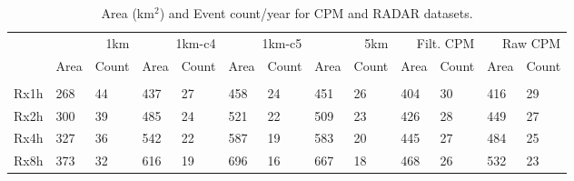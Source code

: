 \begin{table}[ht!]
\caption{Area (km$^2$) and Event count/year for  CPM  and  RADAR datasets.}
\label{tab:event_stats}
\begin{tabular}{l|ll|ll|ll|ll|ll|ll}
\toprule
 & \multicolumn{2}{r}{1km} & \multicolumn{2}{r}{1km-c4} & \multicolumn{2}{r}{1km-c5} & \multicolumn{2}{r}{5km} & \multicolumn{2}{r}{Filt. CPM} & \multicolumn{2}{r}{Raw CPM} \\
 & Area & Count & Area & Count & Area & Count & Area & Count & Area & Count & Area & Count \\
 &  &  &  &  &  &  &  &  &  &  &  &  \\
\midrule
Rx1h & 268 & 44 & 437 & 27 & 458 & 24 & 451 & 26 & 404 & 30 & 416 & 29 \\
Rx2h & 300 & 39 & 485 & 24 & 521 & 22 & 509 & 23 & 426 & 28 & 449 & 27 \\
Rx4h & 327 & 36 & 542 & 22 & 587 & 19 & 583 & 20 & 445 & 27 & 484 & 25 \\
Rx8h & 373 & 32 & 616 & 19 & 696 & 16 & 667 & 18 & 468 & 26 & 532 & 23 \\
\bottomrule
\end{tabular}
\end{table}
